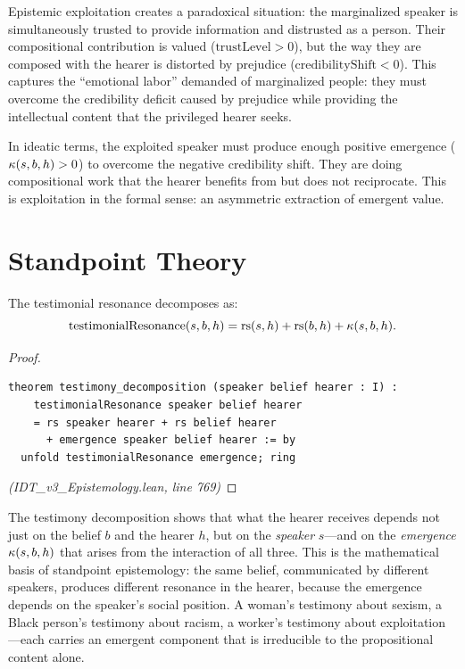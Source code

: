 \begin{interpretation}
Epistemic exploitation creates a paradoxical situation: the marginalized speaker
is simultaneously trusted to provide information and distrusted as a person.
Their compositional contribution is valued ($\mathrm{trustLevel} > 0$), but
the way they are composed with the hearer is distorted by prejudice
($\mathrm{credibilityShift} < 0$). This captures the ``emotional labor''
demanded of marginalized people: they must overcome the credibility deficit
caused by prejudice while providing the intellectual content that the
privileged hearer seeks.

In ideatic terms, the exploited speaker must produce enough positive emergence
($\kappa(s, b, h) > 0$) to overcome the negative credibility shift. They
are doing compositional work that the hearer benefits from but does not
reciprocate. This is exploitation in the formal sense: an asymmetric extraction
of emergent value.
\end{interpretation}


\section{Standpoint Theory}

\begin{theorem}
\label{thm:testimony-decomposition}
The testimonial resonance decomposes as:
\[
  \mathrm{testimonialResonance}(s, b, h) = \mathrm{rs}(s, h) + \mathrm{rs}(b, h) + \kappa(s, b, h).
\]
\end{theorem}

\begin{proof}
\begin{lstlisting}
theorem testimony_decomposition (speaker belief hearer : I) :
    testimonialResonance speaker belief hearer
    = rs speaker hearer + rs belief hearer
      + emergence speaker belief hearer := by
  unfold testimonialResonance emergence; ring
\end{lstlisting}
\textit{(IDT\_v3\_Epistemology.lean, line 769)}
\end{proof}

\begin{interpretation}
The testimony decomposition shows that what the hearer receives depends not
just on the belief $b$ and the hearer $h$, but on the \emph{speaker} $s$---and
on the \emph{emergence} $\kappa(s,b,h)$ that arises from the interaction of
all three. This is the mathematical basis of standpoint epistemology: the
same belief, communicated by different speakers, produces different resonance
in the hearer, because the emergence depends on the speaker's social position.
A woman's testimony about sexism, a Black person's testimony about racism, a
worker's testimony about exploitation---each carries an emergent component that
is irreducible to the propositional content alone.
\end{interpretation}

